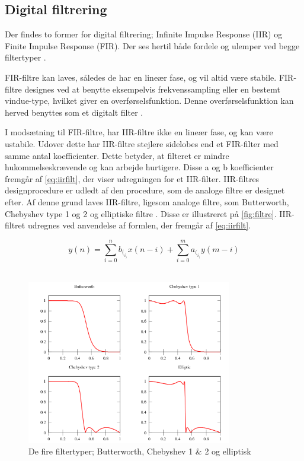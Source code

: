 \subsection{Digital filtrering} \label{sec:teori_filter}
Der findes to former for digital filtrering; Infinite Impulse Response (IIR) og Finite Impulse Response (FIR). Der ses hertil både fordele og ulemper ved begge filtertyper \citep{blandford2012}.

FIR-filtre kan laves, således de har en lineær fase, og vil altid være stabile. FIR-filtre designes ved at benytte eksempelvis frekvenssampling eller en bestemt vindue-type, hvilket giver en overførselsfunktion. Denne overførselsfunktion kan herved benyttes som et digitalt filter \citep{blandford2012}. 

I modsætning til FIR-filtre, har IIR-filtre ikke en lineær fase, og kan være ustabile. Udover dette har IIR-filtre stejlere sidelobes end et FIR-filter med samme antal koefficienter. Dette betyder, at filteret er mindre hukommelseskrævende og kan arbejde hurtigere. Disse a og b koefficienter fremgår af \autoref{eq:iirfilt}, der viser udregningen for et IIR-filter. IIR-filtres designprocedure er udledt af den procedure, som de analoge filtre er designet efter. Af denne grund laves IIR-filtre, ligesom analoge filtre, som Butterworth, Chebyshev type 1 og 2 og elliptiske filtre \citep{blandford2012}. Disse er illustreret på \autoref{fig:filtre}. IIR-filtret udregnes ved anvendelse af formlen, der fremgår af \autoref{eq:iirfilt}\citep{francis2009}.

\noindent
\begin{equation}
y(n)=\sum^{n}_{i=0}b_(_i_)x(n-i)+\sum^{m}_{i=0}a_(_i_)y(m-i)
\label{eq:iirfilt}
\end{equation}
\\

\begin{figure}[H]
\centering
\includegraphics[width=0.8\textwidth]{figures/filtre}
\caption{De fire filtertyper; Butterworth, Chebyshev 1 \& 2 og elliptisk \citep{wikipedia2016}}
\label{fig:filtre}
\end{figure}

